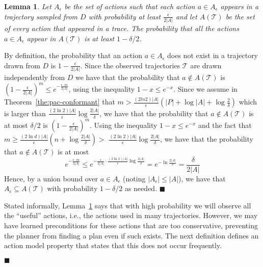 \documentclass{article}
\newtheorem{lemma}{Lemma}
\newenvironment{proof}{\noindent{\bf Proof:~~}}{\qed}
\newcommand{\qed}{\hfill\ensuremath{\blacksquare}}
\begin{document}
\begin{proof}
		\begin{lemma}
			Let $A_\epsilon$ be the set of actions such that each action $a\in A_\epsilon$ appears in a trajectory sampled from $D$ with probability at least $\frac{\epsilon}{2|A|}$ and let $A(\mathcal{T})$ be the set of every action that appeared in a trace. 
			The probability that all the actions $a\in A_\epsilon$ 
			appear in $A(\mathcal{T})$ is at least $1-\delta/2$.
			\label{lem:sufficientActions}
		\end{lemma}
		\begin{proof}
			By definition, the probability that an action $a\in A_\epsilon$ does not exist in a trajectory drawn from $D$ is $1-\frac{\epsilon}{2|A|}$. 
			Since the observed trajectories $\mathcal{T}$ are drawn independently from $D$ we have that the probability that $a\notin A(\mathcal{T})$ is
			$(1-\frac{\epsilon}{2|A|})^m\leq e^{-\frac{\epsilon\cdot m}{2|A|}}$, 
			using the inequality $1-x\leq e^{-x}$. 
			Since we assume in Theorem~\ref{the:pac-conformant} that $m>\frac{(2ln 2)|A|}{\epsilon}(|P|+\log |A|+\log\frac{2}{\delta})$
			which is larger than $\frac{(2\ln 2)|A|}{\epsilon}\log\frac{2|A|}{\delta}$, 
			we have that the probability that $a\notin A(\mathcal{T})$ is at most $\delta/2$ is $(1-\frac{\epsilon}{2|A|})^m$. 
			Using the inequality $1-x\leq e^{-x}$ and 
			the fact that 
			$m\geq\frac{(2\ln  d)|A|}{\epsilon}(n+\log\frac{2|A|}{\delta})$$>$
			$\frac{(2\ln 2)|A|}{\epsilon}\log\frac{2|A|}{\delta}$, we have that the probability that $a\notin A(\mathcal{T})$ is at most
			\begin{equation}
			e^{-\frac{\epsilon\cdot m}{2|A|}}
			\leq e^{-\frac{\epsilon}{2|A|} \cdot \frac{(2\ln 2)|A|}{\epsilon}\log\frac{2|A|}{\delta}}
			=e^{-\ln\frac{2|A|}{\delta}}=\frac{\delta}{2|A|}
			\end{equation}
			Hence, by a union bound over $a\in A_\epsilon$ (noting $|A_\epsilon|\leq |A|$), we have that $A_\epsilon\subseteq A(\mathcal{T})$ with probability $1-\delta/2$ as needed.
		\end{proof}
		
		Stated informally, Lemma~\ref{lem:sufficientActions} says that with high probability we will observe
		all the ``useful'' actions, i.e., the actions used in many trajectories. However, we may have learned 
		preconditions for these actions that are too conservative, 
		preventing the planner from finding a plan even if such exists. 
		The next definition defines an action model property that states that this does not occur frequently. 
		

\end{proof}
\end{document}
